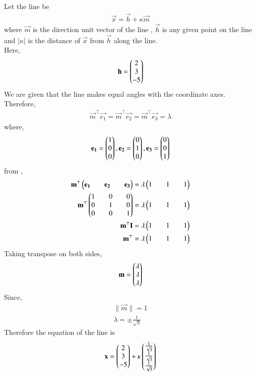 \documentclass[journal]{IEEEtran}
\begin{document}
Let the line be
\begin{align}
    \vec{x} = \vec{h} + \kappa\vec{m}
\end{align}
where $\vec{m}$ is the direction unit vector of the line ,  $\vec{h}$ is any given point on the line and $\lvert \kappa \rvert$ is the distance of $\vec{x}$ from $\vec{h}$ along the line.\\
Here,
\begin{align}
    \mathbf{h} = \begin{pmatrix}2 \\ 3 \\ -5\end{pmatrix}
\end{align}
We are given that the line makes equal angles with the coordinate axes. Therefore,\\
\begin{align}
    \vec{m}^\top\vec{e_1} = \vec{m}^\top\vec{e_2} = \vec{m}^\top\vec{e_3} = \lambda
\end{align}
where,
\begin{align}
    \mathbf{e_1} = \begin{pmatrix}1 \\ 0 \\ 0\end{pmatrix},
    \mathbf{e_2} = \begin{pmatrix}0 \\ 1 \\ 0\end{pmatrix},
    \mathbf{e_3} = \begin{pmatrix}0 \\ 0 \\ 1\end{pmatrix}
\end{align}
from ,
\begin{align}
    \mathbf{m}^\top\begin{pmatrix}\mathbf{e_1} && \mathbf{e_2} && \mathbf{e_3}\end{pmatrix} = \lambda\begin{pmatrix}1 && 1 && 1\end{pmatrix}\\
    \mathbf{m}^\top\begin{pmatrix}1 && 0 && 0 \\ 0 && 1 && 0 \\ 0 && 0 && 1\end{pmatrix} = \lambda\begin{pmatrix}1 && 1 && 1\end{pmatrix}\\
    \mathbf{m}^\top\mathbf{I} = \lambda\begin{pmatrix}1 && 1 && 1\end{pmatrix}\\
    \mathbf{m}^\top = \lambda\begin{pmatrix}1 && 1 && 1\end{pmatrix}
\end{align}
Taking transpose on both sides,
\begin{align}
    \mathbf{m} = \begin{pmatrix}\lambda \\ \lambda \\ \lambda\end{pmatrix}
\end{align}
Since,
\begin{align}
    \big\lVert \vec{m} \big\rVert = 1\\
    \lambda = \pm\frac{1}{\sqrt{3}}
\end{align}
Therefore the equation of the line is
\begin{align}
    \mathbf{x} = \begin{pmatrix}2 \\ 3 \\ -5\end{pmatrix} + \kappa\begin{pmatrix}\frac{1}{\sqrt{3}} \\ \frac{1}{\sqrt{3}} \\ \frac{1}{\sqrt{3}}\end{pmatrix} 
\end{align}
\end{document}
